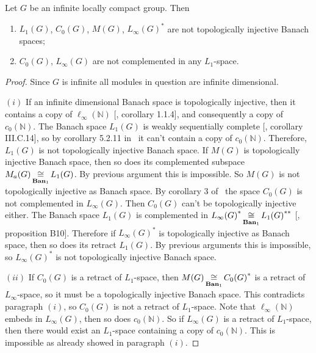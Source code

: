 \begin{proposition}\label{StdModAreNotRetrOfL1LInf} Let $G$ be an infinite
locally compact group. Then

\begin{enumerate}[label = (\roman*)]
    \item $L_1(G)$, $C_0(G)$, $M(G)$, ${L_\infty(G)}^*$ are not 
    topologically injective Banach spaces;

    \item $C_0(G)$, $L_\infty(G)$ are not complemented in any $L_1$-space.
\end{enumerate}
\end{proposition}
\begin{proof}
Since $G$ is infinite all modules in question are infinite dimensional.

$(i)$ If an infinite dimensional Banach space is topologically injective, then it
contains a copy of $\ell_\infty(\mathbb{N})$ [\cite{RosOnRelDisjFamOfMeas},
corollary 1.1.4], and consequently a copy of $c_0(\mathbb{N})$. The Banach space
$L_1(G)$ is weakly sequentially complete [\cite{WojBanSpForAnalysts}, corollary
III.C.14], so by corollary 5.2.11 in~\cite{KalAlbTopicsBanSpTh} it can't contain
a copy of $c_0(\mathbb{N})$. Therefore, $L_1(G)$ is not topologically injective
Banach space.  If $M(G)$ is topologically injective Banach space, then so does
its complemented subspace $M_a(G)\mathop{\mathbin{\cong}}\limits_{\mathbf{Ban}_1}L_1(G)$. By previous
argument this is impossible. So $M(G)$ is not topologically injective as Banach
space. By corollary 3 of~\cite{LauMingComplSubspInLInfOfG} the space $C_0(G)$ is
not complemented in $L_\infty(G)$. Then $C_0(G)$ can't be topologically
injective either. The Banach space $L_1(G)$ is complemented in
${L_\infty(G)}^*\mathop{\mathbin{\cong}}\limits_{\mathbf{Ban}_1}{L_1(G)}^{**}$ [\cite{DefFloTensNorOpId},
proposition  B10]. Therefore if ${L_\infty(G)}^*$ is topologically injective as
Banach space, then so does its retract $L_1(G)$. By previous arguments this is
impossible, so ${L_\infty(G)}^*$ is not topologically injective Banach space.

$(ii)$ If $C_0(G)$ is a retract of $L_1$-space, then
$M(G)\mathop{\mathbin{\cong}}\limits_{\mathbf{Ban}_1}{C_0(G)}^*$ is a retract of $L_\infty$-space, 
so it must be a topologically injective Banach space. This contradicts 
paragraph $(i)$, so $C_0(G)$ is not a retract of $L_1$-space. 
Note that $\ell_\infty(\mathbb{N})$ embeds in $L_\infty(G)$, then so 
does $c_0(\mathbb{N})$. So if $L_\infty(G)$ is
a retract of $L_1$-space, then there would exist an $L_1$-space containing a
copy of $c_0(\mathbb{N})$. This is impossible as already showed in paragraph
$(i)$.
\end{proof}

